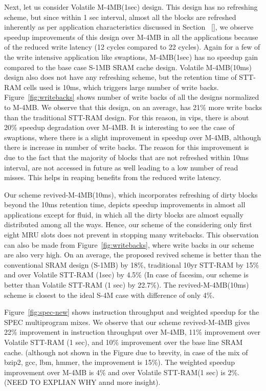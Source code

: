 Next, let us consider Volatile M-4MB(1sec) design. This design has no refreshing scheme, but since within 1 sec interval,
almost all the blocks are refreshed inherently as per application characteristics discussed in Section ~\ref{},
we observe speedup improvements of this design over M-4MB in all the applications because of the reduced
write latency (12 cycles compared to 22 cycles).
Again for a few of the write intensive application like swaptions, M-4MB(1sec) has no speedup gain compared to
the base case S-1MB SRAM cache design.
Volatile M-4MB(10ms) design also does not have any refreshing scheme, but the retention time of STT-RAM
cells used is 10ms, which triggers large number of write backs.
Figure~\ref{fig:writebacks} shows number of write backs of all the designs normalized to M-4MB.
We observe that this design, on an average, has 21\% more
write backs than the traditional STT-RAM design.
For this reason, in vips, there is about 20\% speedup degradation over M-4MB.
It is interesting to see the case of swaptions, where there is a slight improvement in speedup over M-4MB, although
there is increase in number of write backs. The reason for this improvement is due to the fact that
the majority of blocks that are not refreshed within 10ms interval,
are not accessed in future as well leading to a low number of read misses.
This helps in reaping benefits from the reduced write latency.

Our scheme revived-M-4MB(10ms), which incorporates refreshing of dirty blocks beyond the 10ms retention time,
depicts speedup improvements
in almost all applications except for fluid, in which all the dirty blocks are almost equally distributed among
all the ways. Hence, our scheme of the considering only first eight MRU slots does not prevent in stopping
many writebacks. This observation can also be made from Figure~\ref{fig:writebacks}, where write backs in our scheme are also
very high. On an average,  the proposed revived scheme is better than the conventional SRAM design (S-1MB) by 18\%,
traditional 10yr STT-RAM by 15\% and over Volatile STT-RAM (1sec)
by 4.5\% (In case of facesim, our scheme is better than Volatile STT-RAM (1 sec) by 22.7\%).
The revived-M-4MB(10ms) scheme is closest to the ideal S-4M case with difference of only 4\%.

Figure~\ref{fig:spec-new} shows instruction throughput and weighted speedup for the  SPEC multiprogram
mixes. We observe that our scheme revived-M-4MB gives 22\% improvement in instruction throughput
over M-4MB, 11\% improvement over Volatile STT-RAM (1 sec), and 10\% improvement over
the base line SRAM cache. (although not shown in the Figure due to brevity, in case of the mix of
bzip2, gcc, lbm, hmmer, the improvement is 15\%). The weighted speedup improvement over M-4MB is 4\%
and over Volatile STT-RAM(1 sec) is 2\%. (NEED TO EXPLIAN WHY annd more insight).


